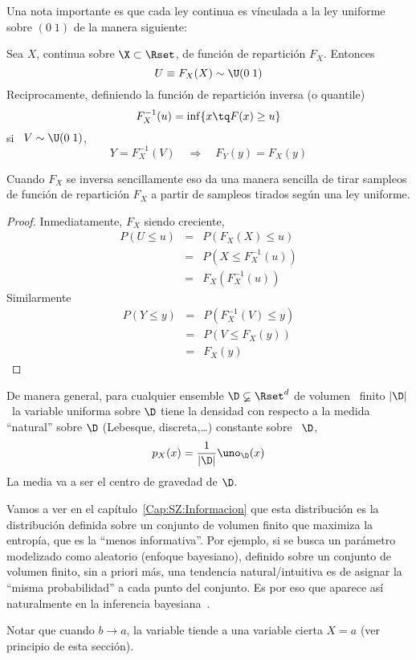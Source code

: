 Una nota  importante es que cada ley  continua es v\'inculada a  la ley uniforme
sobre $(0 \; 1)$ de la manera siguiente:
%
\begin{lema}[Inversi\'on]\label{Lem:MP:InversionUniforme}
Sea $X$, continua sobre $\X \subset \Rset$, de funci\'on de repartici\'on $F_X$. Entonces
%
\[
U \equiv F_X(X) \sim \U(0 \; 1)
\]
%
Reciprocamente, definiendo la funci\'on de repartici\'on inversa (o quantile)
%
\[
F_X^{-1}(u) = \inf \{ x \tq F(x) \ge u \}
\]
%
si \ $V \sim \U( 0 \; 1 )$,
%
\[
Y = F_X^{-1}(V) \quad \Rightarrow \quad F_Y(y) = F_X(y)
\]
\end{lema}
%
Cuando  $F_X$ se  inversa  sencillamente eso  da  una manera  sencilla de  tirar
sampleos de funci\'on de repartici\'on $F_X$ a partir de sampleos tirados seg\'un
una ley uniforme.
%
\begin{proof}
Inmediatamente, $F_X$ siendo creciente,
%
\begin{eqnarray*}
P(U \le u) & = &  P( F_X(X) \le u)\\[2mm]
%
& = & P(X \le F_X^{-1}(u))\\[2mm]
%
& = & F_X\left( F_X^{-1} (u) \right)
\end{eqnarray*}
%
Similarmente
%
\begin{eqnarray*}
P(Y \le y) & = &  P( F_X^{-1}(V) \le y)\\[2mm]
%
& = & P(V \le F_X(y))\\[2mm]
%
& = & F_X(y)
\end{eqnarray*}
%
\end{proof}

De manera  general, para  cualquier ensemble $\D  \varsubsetneq \Rset^d$ de  volumen \
finito $|\D|$ \,  la variable uniforma sobre $\D$  tiene la densidad con  respecto a la
medida  ``natural'' sobre  $\D$  (Lebesque, discreta,\ldots)  constante sobre  \
$\D$,
%
\[
p_X(x) = \frac{1}{|\D|} \uno_{\D}(x)
\]
%
La media va a ser el centro de gravedad de $\D$.

Vamos a ver en el cap\'itulo~\ref{Cap:SZ:Informacion} que esta distribuci\'on es
la distribuci\'on definida  sobre un conjunto de volumen  finito que maximiza la
entrop\'ia, \ie  que es la  ``menos informativa''. Por  ejemplo, si se  busca un
par\'ametro  modelizado como  aleatorio (enfoque  bayesiano), definido  sobre un
conjunto de volumen finito, sin  a priori m\'as, una tendencia natural/intuitiva
es de  asignar la ``misma probabilidad'' a  cada punto del conjunto.  Es por eso
que aparece as\'i naturalmente en la inferencia bayesiana~\cite{Rob07}.
 
Notar que  cuando $b \to a$,  la variable tiende a  una variable cierta  $X = a$
(ver principio de esta secci\'on).

